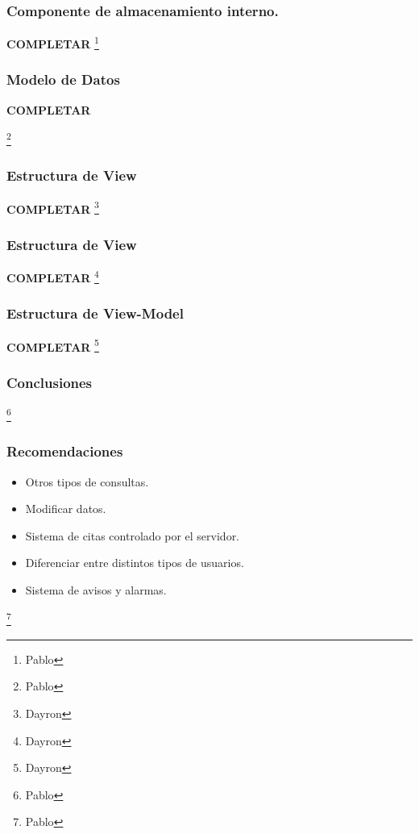 \documentclass[14pt]{beamer}
\begin{document}
\begin{frame}
\frametitle{Componente de almacenamiento interno.}

\textbf{COMPLETAR}
\footnote{Pablo}
\end{frame}



\begin{frame}
\frametitle{Modelo de Datos}

\textbf{COMPLETAR}

\footnote{Pablo}
\end{frame}


\begin{frame}
\frametitle{Estructura de View}
\textbf{COMPLETAR}
\footnote{Dayron}
\end{frame}

\begin{frame}
\frametitle{Estructura de View}
\textbf{COMPLETAR}
\footnote{Dayron}
\end{frame}


\begin{frame}
\frametitle{Estructura de View-Model}
\textbf{COMPLETAR}
\footnote{Dayron}
\end{frame}

\begin{frame}
\frametitle{Conclusiones}

\footnote{Pablo}
\end{frame}


\begin{frame}
\frametitle{Recomendaciones}

\begin{itemize}
\item Otros tipos de consultas.
\item Modificar datos.
\item Sistema de citas controlado por el servidor.
\item Diferenciar entre distintos tipos de usuarios.
\item Sistema de avisos y alarmas.
\end{itemize}

\footnote{Pablo}
\end{frame}





\begin{frame}
\maketitle
\end{frame}
\end{document}
